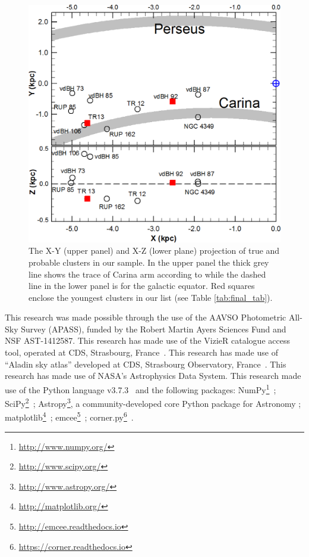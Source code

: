 \documentclass[draft]{aa}
\begin{document}
\begin{figure}[ht]
    \centering
    \includegraphics[width=\hsize]{../figs/xy_xz.png}
    \caption{The X-Y (upper panel) and X-Z (lower plane) projection of true and
    probable clusters in our sample. In the upper panel the thick grey line
    shows the trace of Carina arm according to \cite{valle_2005} while the
    dashed line in the lower panel is for the galactic equator. Red squares
    enclose the youngest clusters in our list (see Table \ref{tab:final_tab}).}
    \label{fig68}
\end{figure}


\begin{acknowledgements}
%
This research was made possible through the use of the AAVSO Photometric
All-Sky Survey (APASS), funded by the Robert Martin Ayers Sciences Fund and NSF
AST-1412587.
%
This research has made use of the VizieR catalogue access tool, operated at CDS,
Strasbourg, France~\citep{Ochsenbein_2000}.
%
This research has made use of ``Aladin sky atlas'' developed at
CDS, Strasbourg Observatory, France~\citep{Bonnarel2000,Boch2014}.
%
This research has made use of NASA's Astrophysics Data System.
%
This research made use of the Python language v3.7.3~\citep{vanRossum_1995}
and the following packages:
NumPy\footnote{\url{http://www.numpy.org/}}~\citep{vanDerWalt_2011};
SciPy\footnote{\url{http://www.scipy.org/}}~\citep{Jones_2001};
Astropy\footnote{\url{http://www.astropy.org/}}, a community-developed core
Python package for Astronomy \citep{Astropy_2013};
matplotlib\footnote{\url{http://matplotlib.org/}}~\citep{hunter_2007};
emcee\footnote{\url{http://emcee.readthedocs.io}}~\citep{emcee};
corner.py\footnote{\url{https://corner.readthedocs.io}}~\citep{corner}.
\end{acknowledgements}
\end{document}
